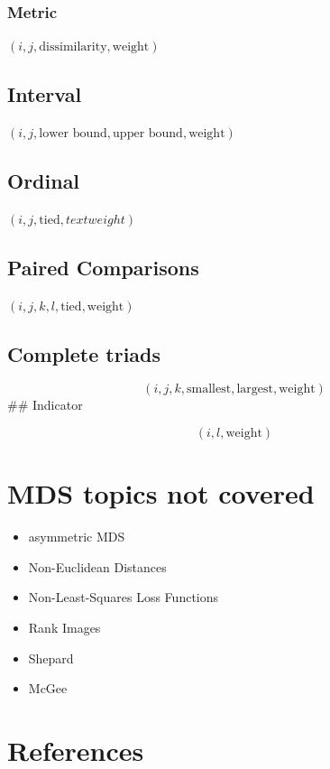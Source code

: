 \documentclass[
  12pt,
]{article}
\providecommand{\tightlist}{%
  \setlength{\itemsep}{0pt}\setlength{\parskip}{0pt}}
\begin{document}
\subsubsection{Metric}\label{metric}

\((i, j, \text{dissimilarity}, \text{weight})\)

\subsection{Interval}\label{interval}

\((i, j, \text{lower bound}, \text{upper bound}, \text{weight})\)

\subsection{Ordinal}\label{ordinal}

\((i, j, \text{tied}, text{weight})\)

\subsection{Paired Comparisons}\label{paired-comparisons}

\((i, j, k, l, \text{tied}, \text{weight})\)

\subsection{Complete triads}\label{complete-triads}

\[(i, j, k, \text{smallest}, \text{largest}, \text{weight})\]
\#\# Indicator

\[(i, l, \text{weight})\]

\section{MDS topics not covered}\label{mds-topics-not-covered}

\begin{itemize}
\tightlist
\item
  asymmetric MDS
\item
  Non-Euclidean Distances
\item
  Non-Least-Squares Loss Functions
\item
  Rank Images
\item
  Shepard
\item
  McGee
\end{itemize}

\section*{References}\label{references}
\end{document}
